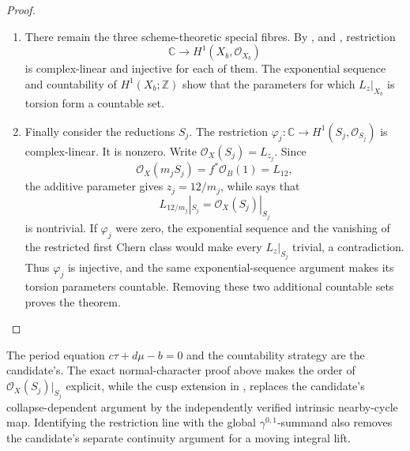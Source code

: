 \begin{proof}
\begin{enumerate}[label={$\langle1\rangle$\arabic*.},leftmargin=*]
\item There remain the three scheme-theoretic special fibres.  By
,  and , restriction
\[
 \mathbb C\longrightarrow H^1(X_b,\mathcal O_{X_b})
\]
is complex-linear and injective for each of them.  The exponential sequence
and countability of \(H^1(X_b;\mathbb Z)\) show that the parameters for
which \(L_z|_{X_b}\) is torsion form a countable set.

\item Finally consider the reductions \(S_j\).  The restriction
\(\varphi_j:\mathbb C\to H^1(S_j,\mathcal O_{S_j})\) is complex-linear.
It is nonzero.  Write \(\mathcal O_X(S_j)=L_{z_j}\).  Since
\[
 \mathcal O_X(m_jS_j)=f^*\mathcal O_B(1)=L_{12},
\]
the additive parameter gives \(z_j=12/m_j\), while
 says that
\[
 L_{12/m_j}|_{S_j}=\mathcal O_X(S_j)|_{S_j}
\]
is nontrivial.  If \(\varphi_j\) were zero, the exponential sequence and
the vanishing of the restricted first Chern class would make every
\(L_z|_{S_j}\) trivial, a contradiction.  Thus \(\varphi_j\) is
injective, and the same exponential-sequence argument makes its torsion
parameters countable.  Removing these two additional countable sets proves
the theorem.

\end{enumerate}
\end{proof}



\begin{remark}\hypertarget{tag-01TQ}{}\label{inv:wb:uniform-nontorsion-provenance}

The period equation \(c\tau+d\mu-b=0\) and the countability strategy are
the candidate's.  The exact normal-character proof above makes the order of
\(\mathcal O_X(S_j)|_{S_j}\) explicit, while the cusp extension in
,  replaces the candidate's
collapse-dependent argument by the independently verified intrinsic
nearby-cycle map.  Identifying the restriction line with the global
\(\gamma^{0,1}\)-summand also removes the candidate's separate continuity
argument for a moving integral lift.
\end{remark}